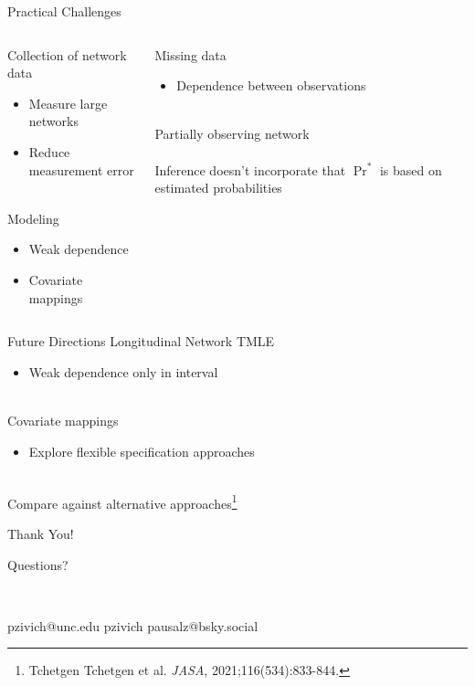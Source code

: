 \documentclass{beamer}
\begin{document}
\begin{frame}{Practical Challenges}
	\begin{columns}
		\begin{column}{0.5\textwidth}
			Collection of network data
			\begin{itemize}
				\item Measure large networks
				\item Reduce measurement error
			\end{itemize}
			~\\
			Modeling
			\begin{itemize}
				\item Weak dependence
				\item Covariate mappings
			\end{itemize}
		\end{column}
		\begin{column}{0.5\textwidth}
			Missing data
			\begin{itemize}
				\item Dependence between observations
			\end{itemize}
			~\\
			Partially observing network
			~\\~\\
			Inference doesn't incorporate that $\Pr^*$ is based on estimated probabilities
		\end{column}
	\end{columns}
\end{frame}

\begin{frame}{Future Directions}
	Longitudinal Network TMLE
	\begin{itemize}
		\item Weak dependence only in interval
	\end{itemize}
	~\\
	Covariate mappings
	\begin{itemize}
		\item Explore flexible specification approaches
	\end{itemize}
	~\\
	Compare against alternative approaches\footnote[frame]{Tchetgen Tchetgen et al. \textit{JASA}, 2021;116(534):833-844.}
\end{frame}

\begin{frame}{Thank You!}
	\begin{center}
		\LARGE
		Questions?
	\end{center}
	~\\
	\begin{center}
		\small
		\faEnvelope \quad pzivich@unc.edu \qquad \quad 
		\faGithub \quad pzivich \qquad \quad
		pausalz@bsky.social
	\end{center}
\end{frame}
\end{document}
